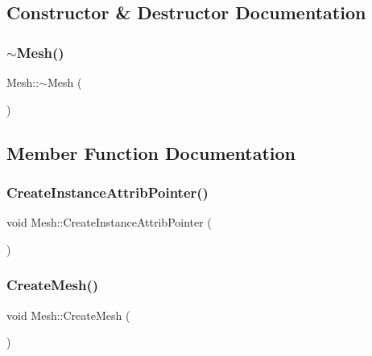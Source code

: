 \subsection{Constructor \& Destructor Documentation}
\mbox{\label{class_mesh_a5efe4da1a4c0971cfb037bd70304c303}} 
\subsubsection{\texorpdfstring{$\sim$Mesh()}{~Mesh()}}
{\footnotesize\ttfamily Mesh\+::$\sim$\+Mesh (\begin{DoxyParamCaption}{ }\end{DoxyParamCaption})}



\subsection{Member Function Documentation}
\mbox{\label{class_mesh_a916735fb6745a444abc21011e11ed3e4}} 
\subsubsection{\texorpdfstring{CreateInstanceAttribPointer()}{CreateInstanceAttribPointer()}}
{\footnotesize\ttfamily void Mesh\+::\+Create\+Instance\+Attrib\+Pointer (\begin{DoxyParamCaption}{ }\end{DoxyParamCaption})}

\mbox{\label{class_mesh_ab4d75bfd6e4603aa774eba1cfb83bffe}} 
\subsubsection{\texorpdfstring{CreateMesh()}{CreateMesh()}}
{\footnotesize\ttfamily void Mesh\+::\+Create\+Mesh (\begin{DoxyParamCaption}{ }\end{DoxyParamCaption})}

\mbox{\label{class_mesh_afdd95c079fd0442afef8a6c421c8bfc9}} 
